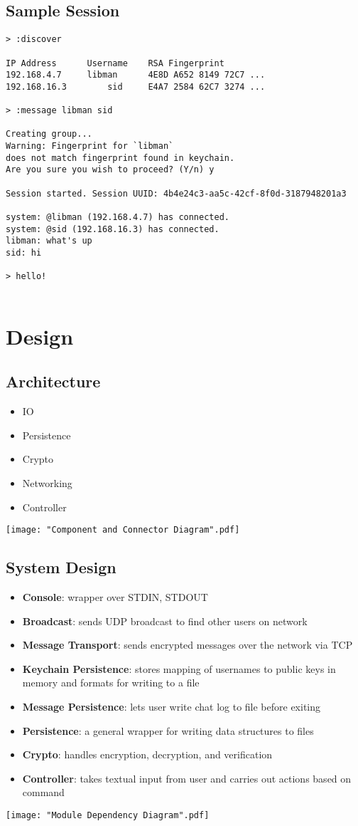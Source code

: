 \documentclass{scrartcl}
\begin{document}
\subsection{Sample Session}
\begin{lstlisting}
> :discover

IP Address		Username	RSA Fingerprint
192.168.4.7		libman		4E8D A652 8149 72C7 ...
192.168.16.3		sid		E4A7 2584 62C7 3274 ...

> :message libman sid

Creating group...
Warning: Fingerprint for `libman` 
does not match fingerprint found in keychain.
Are you sure you wish to proceed? (Y/n) y

Session started. Session UUID: 4b4e24c3-aa5c-42cf-8f0d-3187948201a3

system: @libman (192.168.4.7) has connected.
system: @sid (192.168.16.3) has connected.
libman: what's up
sid: hi

> hello!
		

\end{lstlisting}

\section{Design}
\subsection{Architecture}
\begin{itemize}
	\item IO
	\item Persistence
	\item Crypto
	\item Networking
	\item Controller
\end{itemize}
\texttt{[image: "Component and Connector Diagram".pdf]}

\subsection{System Design}
\begin{itemize}
	\item \textbf{Console}: wrapper over STDIN, STDOUT
	\item \textbf{Broadcast}: sends UDP broadcast to find other users on network
	\item \textbf{Message Transport}: sends encrypted messages over the network via TCP
	\item \textbf{Keychain Persistence}: stores mapping of usernames to public keys in memory and formats for writing to a file 
	\item \textbf{Message Persistence}: lets user write chat log to file before exiting
	\item \textbf{Persistence}: a general wrapper for writing data structures to files
	\item \textbf{Crypto}: handles encryption, decryption, and verification
	\item \textbf{Controller}: takes textual input from user and carries out actions based on command 
\end{itemize}
\texttt{[image: "Module Dependency Diagram".pdf]}
\end{document}
